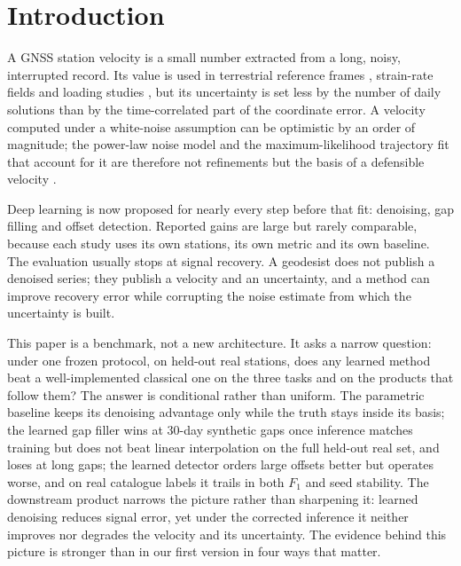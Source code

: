 \section{Introduction}
\label{sec:intro}

A GNSS station velocity is a small number extracted from a long, noisy, interrupted
record. Its value is used in terrestrial reference frames \citep{altamimi2017pmm},
strain-rate fields \citep{kreemer2014gsrm} and loading studies
\citep{blewitt2002annual}, but its uncertainty is set less by the number of daily
solutions than by the time-correlated part of the coordinate error. A velocity
computed under a white-noise assumption can be optimistic by an order of
magnitude; the power-law noise model and the maximum-likelihood trajectory fit
that account for it are therefore not refinements but the basis of a defensible
velocity \citep{mao1999noise,williams2003coloured,amirisimkooei2007noise}.

Deep learning is now proposed for nearly every step before that fit: denoising,
gap filling and offset detection. Reported gains are large but rarely comparable,
because each study uses its own stations, its own metric and its own baseline.
The evaluation usually stops at signal recovery. A geodesist does not publish a
denoised series; they publish a velocity and an uncertainty, and a method can
improve recovery error while corrupting the noise estimate from which the
uncertainty is built.

This paper is a benchmark, not a new architecture. It asks a narrow question:
under one frozen protocol, on held-out real stations, does any learned method
beat a well-implemented classical one on the three tasks and on the products that
follow them? The answer is conditional rather than uniform. The parametric
baseline keeps its denoising advantage only while the truth stays inside its
basis; the learned gap filler wins at 30-day synthetic gaps once inference
matches training but does not beat linear interpolation on the full held-out
real set, and loses at long gaps; the learned detector orders large offsets
better but operates worse, and on real catalogue labels it trails in both $F_1$
and seed stability. The downstream product narrows the picture rather than
sharpening it: learned denoising reduces signal error, yet under the corrected
inference it neither improves nor degrades the velocity and its uncertainty.
The evidence behind this picture is stronger than in our first version in four
ways that matter.

